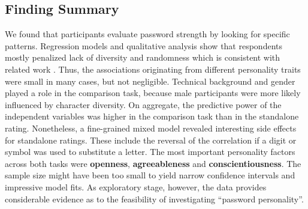\subsection{Finding Summary}
We found that participants evaluate password strength by looking for specific patterns. Regression models and qualitative analysis show that respondents mostly penalized lack of diversity and randomness which is consistent with related work \cite{Ur2016PerceptionsPassword}. Thus, the associations originating from different personality traits were small in many cases, but not negligible. Technical background and gender played a role in the comparison task, because male participants were more likely influenced by character diversity. On aggregate, the predictive power of the independent variables was higher in the comparison task than in the standalone rating. Nonetheless, a fine-grained mixed model revealed interesting side effects for standalone ratings. These include the reversal of the correlation if a digit or symbol was used to substitute a letter. The most important personality factors across both tasks were \textbf{openness}, \textbf{agreeableness} and \textbf{conscientiousness}. The sample size might have been too small to yield narrow confidence intervals and impressive model fits. As exploratory stage, however, the data provides considerable evidence as to the feasibility of investigating ``password personality''. 